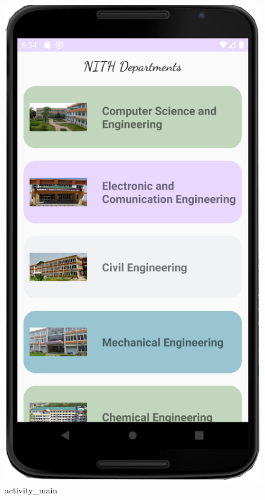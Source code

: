 \documentclass[11pt,a4paper]{report}
\begin{document}
  \begin{figure}[H]
    \centering
    \begin{minipage}[b]{0.3\textwidth}
      \includegraphics[width=\textwidth]{./img/PREVIEW1.png}
      \caption{activity\_main}
    \end{minipage}
    \hfill
    \begin{minipage}[b]{0.3\textwidth}

\end{minipage}
\end{figure}
\end{document}
